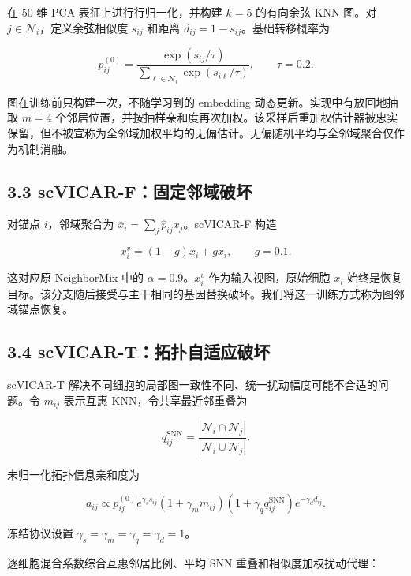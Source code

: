 \documentclass[journal]{IEEEtran}
\begin{document}
在 50 维 PCA 表征上进行行归一化，并构建 $k=5$ 的有向余弦 KNN 图。对 $j\in\mathcal N_i$，定义余弦相似度 $s_{ij}$ 和距离 $d_{ij}=1-s_{ij}$。基础转移概率为

\begin{equation}
p_{ij}^{(0)}=\frac{\exp(s_{ij}/\tau)}{\sum_{\ell\in\mathcal N_i}\exp(s_{i\ell}/\tau)},\qquad \tau=0.2.
\end{equation}

图在训练前只构建一次，不随学习到的 embedding 动态更新。实现中有放回地抽取 $m=4$ 个邻居位置，并按抽样亲和度再次加权。该采样后重加权估计器被忠实保留，但不被宣称为全邻域加权平均的无偏估计。无偏随机平均与全邻域聚合仅作为机制消融。

\subsection{3.3 scVICAR-F：固定邻域破坏}

对锚点 $i$，邻域聚合为 $\bar x_i=\sum_j\widehat p_{ij}x_j$。scVICAR-F 构造

\begin{equation}
x_i^v=(1-g)x_i+g\bar x_i,\qquad g=0.1.
\end{equation}

这对应原 NeighborMix 中的 $\alpha=0.9$。$x_i^v$ 作为输入视图，原始细胞 $x_i$ 始终是恢复目标。该分支随后接受与主干相同的基因替换破坏。我们将这一训练方式称为图邻域锚点恢复。

\subsection{3.4 scVICAR-T：拓扑自适应破坏}

scVICAR-T 解决不同细胞的局部图一致性不同、统一扰动幅度可能不合适的问题。令 $m_{ij}$ 表示互惠 KNN，令共享最近邻重叠为

\begin{equation}
q_{ij}^{\mathrm{SNN}}=\frac{|\mathcal N_i\cap\mathcal N_j|}{|\mathcal N_i\cup\mathcal N_j|}.
\end{equation}

未归一化拓扑信息亲和度为

\begin{equation}
a_{ij}\propto p_{ij}^{(0)}e^{\gamma_s s_{ij}}(1+\gamma_m m_{ij})
(1+\gamma_q q_{ij}^{\mathrm{SNN}})e^{-\gamma_d d_{ij}}.
\end{equation}

冻结协议设置 $\gamma_s=\gamma_m=\gamma_q=\gamma_d=1$。

逐细胞混合系数综合互惠邻居比例、平均 SNN 重叠和相似度加权扰动代理：
\end{document}
